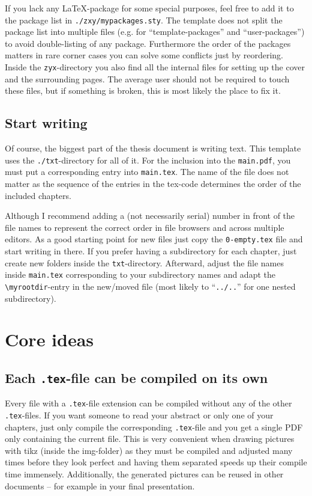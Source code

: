 \documentclass[\myrootdir/main.tex]{subfiles}
\begin{document}
If you lack any LaTeX-package for some special purposes, feel free to add it to the package list in \texttt{./zxy/mypackages.sty}.
The template does not split the package list into multiple files (e.g. for \enquote{template-packages} and \enquote{user-packages}) to avoid double-listing of any package.
Furthermore the order of the packages matters in rare corner cases you can solve some conflicts just by reordering.
Inside the \texttt{zyx}-directory you also find all the internal files for setting up the cover and the surrounding pages.
The average user should not be required to touch these files, but if something is broken, this is most likely the place to fix it.

\newpage
\subsection{Start writing}

Of course, the biggest part of the thesis document is writing text.
This template uses the \texttt{./txt}-directory for all of it.
For the inclusion into the \texttt{main.pdf}, you must put a corresponding entry into \texttt{main.tex}.
The name of the file does not matter as the sequence of the entries in the tex-code determines the order of the included chapters.

Although I recommend adding a (not necessarily serial) number in front of the file names to represent the correct order in file browsers and across multiple editors.
As a good starting point for new files just copy the \texttt{0-empty.tex} file and start writing in there.
If you prefer having a subdirectory for each chapter, just create new folders inside the \texttt{txt}-directory.
Afterward, adjust the file names inside \texttt{main.tex} corresponding to your subdirectory names and adapt the \texttt{\textbackslash myrootdir}-entry in the new/moved file (most likely to \enquote{\texttt{../..}} for one nested subdirectory).


\section{Core ideas}

\subsection{Each \texttt{.tex}-file can be compiled on its own}
Every file with a \texttt{.tex}-file extension can be compiled without any of the other \texttt{.tex}-files.
If you want someone to read your abstract or only one of your chapters, just only compile the corresponding \texttt{.tex}-file and you get a single PDF only containing the current file.
This is very convenient when drawing pictures with tikz (inside the img-folder) as they must be compiled and adjusted many times before they look perfect and having them separated speeds up their compile time immensely.
Additionally, the generated pictures can be reused in other documents -- for example in your final presentation.
\end{document}
